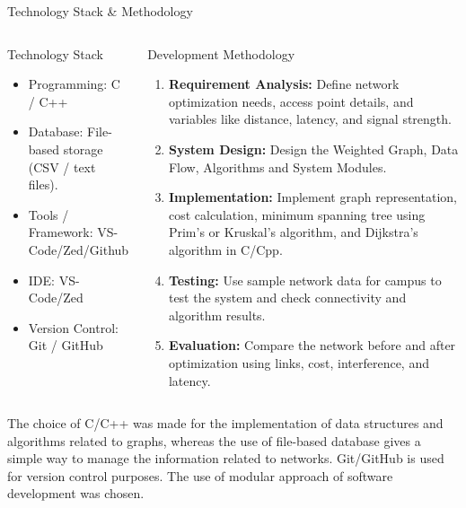 \documentclass[aspectratio=169,11pt]{beamer}
\begin{document}
\begin{frame}{Technology Stack \& Methodology}
\begin{columns}[T,totalwidth=\textwidth]
\begin{block}{Technology Stack}
\scriptsize
\begin{itemize}\itemsep1pt
\item Programming: C / C++
\item Database: File-based storage (CSV / text files).
\item Tools / Framework: VS-Code/Zed/Github
\item IDE: VS-Code/Zed
\item Version Control: Git / GitHub
\end{itemize}
\end{block}

\begin{block}{Development Methodology}
\fontsize{6.2}{7.0}\selectfont
\begin{enumerate}\itemsep0pt
\item \textbf{Requirement Analysis:} Define network optimization needs, access point details, and variables like distance, latency, and signal strength.
\item \textbf{System Design:} Design the Weighted Graph, Data Flow, Algorithms and System Modules.
\item \textbf{Implementation:} Implement graph representation, cost calculation, minimum spanning tree using Prim's or Kruskal's algorithm, and Dijkstra's algorithm in C/Cpp.
\item \textbf{Testing:} Use sample network data for campus to test the system and check connectivity and algorithm results.
\item \textbf{Evaluation:} Compare the network before and after optimization using links, cost, interference, and latency.
\end{enumerate}
\end{block}
\end{columns}

\vfill
\begin{center}
{\tiny\color{GEUGrey}The choice of C/C++ was made for the implementation of data structures and algorithms related to graphs, whereas the use of file-based database gives a simple way to manage the information related to networks. Git/GitHub is used for version control purposes. The use of modular approach of software development was chosen.}
\end{center}
\end{frame}
\end{document}

